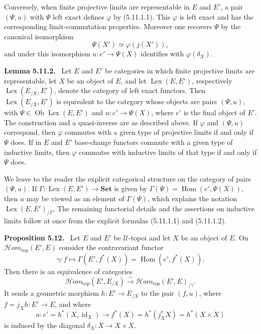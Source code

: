 \documentclass[11pt]{article}
\newcommand{\U}{\mathcal{U}}
\newcommand{\Set}{\mathbf{Set}}
\newcommand{\Hom}{\operatorname{Hom}}
\newcommand{\Ob}{\operatorname{Ob}}
\newcommand{\Ssex}{\operatorname{Lex}}
\newcommand{\Hhomtop}{\mathcal{H}om_{\mathrm{top}}}
\newenvironment{statement}[1]{\par\medskip\noindent\textbf{#1.}\ }{\par\medskip}
\providecommand{\Ob}{\operatorname{Ob}}
\begin{document}
Conversely, when finite projective limits are representable in \(E\) and \(E'\), a pair \((\Psi,u)\) with \(\Psi\) left exact defines \(\varphi\) by (5.11.1.1). This \(\varphi\) is left exact and has the corresponding limit-commutation properties. Moreover one recovers \(\Psi\) by the canonical isomorphism
\begin{equation*}
\Psi(X')\simeq \varphi(j(X')),\tag{5.11.1.2}
\end{equation*}
and under this isomorphism \(u:e'\to\Psi(X)\) identifies with \(\varphi(\delta_X)\).

\begin{statement}{Lemma 5.11.2}
Let \(E\) and \(E'\) be categories in which finite projective limits are representable, let \(X\) be an object of \(E\), and let \(\Ssex(E,E')\), respectively \(\Ssex(E_{/X},E')\), denote the category of left exact functors. Then \(\Ssex(E_{/X},E')\) is equivalent to the category whose objects are pairs \((\Psi,u)\), with \(\Psi\in\Ob\Ssex(E,E')\) and \(u:e'\to\Psi(X)\), where \(e'\) is the final object of \(E'\). The construction and a quasi-inverse are as described above. If \(\varphi\) and \((\Psi,u)\) correspond, then \(\varphi\) commutes with a given type of projective limits if and only if \(\Psi\) does. If in \(E\) and \(E'\) base-change functors commute with a given type of inductive limits, then \(\varphi\) commutes with inductive limits of that type if and only if \(\Psi\) does.
\end{statement}

We leave to the reader the explicit categorical structure on the category of pairs \((\Psi,u)\). If \(\Gamma:\Ssex(E,E')\to\Set\) is given by \(\Gamma(\Psi)=\Hom(e',\Psi(X))\), then \(u\) may be viewed as an element of \(\Gamma(\Psi)\), which explains the notation \(\Ssex(E,E')_{/\Gamma}\). The remaining functorial details and the assertions on inductive limits follow at once from the explicit formulas (5.11.1.1) and (5.11.1.2).

\begin{statement}{Proposition 5.12}
Let \(E\) and \(E'\) be \(\U\)-topoi and let \(X\) be an object of \(E\). On \(\Hhomtop(E',E)\) consider the contravariant functor
\[
\gamma:f\longmapsto \Gamma(E',f^*(X))=\Hom(e',f^*(X)).
\]
Then there is an equivalence of categories
\begin{equation*}
\Hhomtop(E',E_{/X})\xrightarrow{\sim}\Hhomtop(E',E)_{/\gamma}.\tag{5.12.1}
\end{equation*}
It sends a geometric morphism \(h:E'\to E_{/X}\) to the pair \((f,u)\), where \(f=j_Xh:E'\to E\), and where
\[
u:e'=h^*(X,\operatorname{id}_X)\longrightarrow f^*(X)=h^*(j_X^*X)=h^*(X\times X)
\]
is induced by the diagonal \(\delta_X:X\to X\times X\).
\end{statement}
\end{document}
